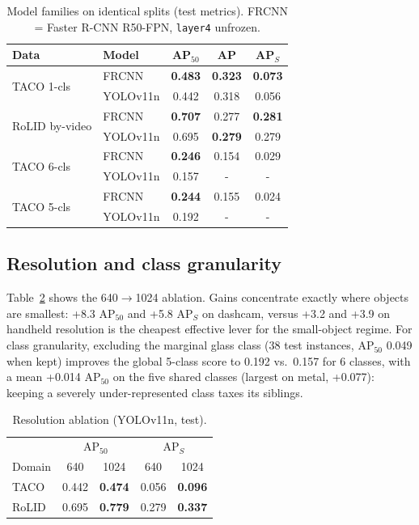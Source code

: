 \documentclass[conference]{IEEEtran}
\begin{document}
\begin{table}[t]
\caption{Model families on identical splits (test metrics). FRCNN = Faster
R-CNN R50-FPN, \texttt{layer4} unfrozen.}
\label{tab:families}
\centering
\small
\begin{tabular}{llccc}
\toprule
Data & Model & AP$_{50}$ & AP & AP$_S$ \\
\midrule
\multirow{2}{*}{TACO 1-cls} & FRCNN & \textbf{0.483} & \textbf{0.323} & \textbf{0.073} \\
 & YOLOv11n & 0.442 & 0.318 & 0.056 \\
\midrule
\multirow{2}{*}{RoLID by-video} & FRCNN & \textbf{0.707} & 0.277 & \textbf{0.281} \\
 & YOLOv11n & 0.695 & \textbf{0.279} & 0.279 \\
\midrule
\multirow{2}{*}{TACO 6-cls} & FRCNN & \textbf{0.246} & 0.154 & 0.029 \\
 & YOLOv11n & 0.157 & - & - \\
\midrule
\multirow{2}{*}{TACO 5-cls} & FRCNN & \textbf{0.244} & 0.155 & 0.024 \\
 & YOLOv11n & 0.192 & - & - \\
\bottomrule
\end{tabular}
\end{table}

\subsection{Resolution and class granularity}
Table~\ref{tab:res} shows the 640$\rightarrow$1024 ablation. Gains concentrate
exactly where objects are smallest: +8.3 AP$_{50}$ and +5.8 AP$_S$ on dashcam,
versus +3.2 and +3.9 on handheld resolution is the cheapest effective lever
for the small-object regime. For class granularity, excluding the marginal
glass class (38 test instances, AP$_{50}$ 0.049 when kept) improves the global
5-class score to 0.192 vs.\ 0.157 for 6 classes, with a mean +0.014 AP$_{50}$
on the five shared classes (largest on metal, +0.077): keeping a
severely under-represented class taxes its siblings.

\begin{table}[t]
\caption{Resolution ablation (YOLOv11n, test).}
\label{tab:res}
\centering
\small
\begin{tabular}{lcccc}
\toprule
 & \multicolumn{2}{c}{AP$_{50}$} & \multicolumn{2}{c}{AP$_S$} \\
Domain & 640 & 1024 & 640 & 1024 \\
\midrule
TACO & 0.442 & \textbf{0.474} & 0.056 & \textbf{0.096} \\
RoLID & 0.695 & \textbf{0.779} & 0.279 & \textbf{0.337} \\
\bottomrule
\end{tabular}
\end{table}
\end{document}
